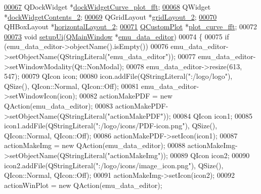 \begin{DoxyCode}
\hypertarget{a00138_source_l00067}{}\hyperlink{a00079_a7474d72172d9e269e8f3cb22bbe2fc86}{00067}     QDockWidget *\hyperlink{a00079_a7474d72172d9e269e8f3cb22bbe2fc86}{dockWidgetCurve\_plot\_fft};
\hypertarget{a00138_source_l00068}{}\hyperlink{a00079_ae304b249d83cb3152fbbf7a7d7e0e29b}{00068}     QWidget *\hyperlink{a00079_ae304b249d83cb3152fbbf7a7d7e0e29b}{dockWidgetContents\_2};
\hypertarget{a00138_source_l00069}{}\hyperlink{a00079_ab6610272c6c39cba66cab113d98dcdcd}{00069}     QGridLayout *\hyperlink{a00079_ab6610272c6c39cba66cab113d98dcdcd}{gridLayout\_2};
\hypertarget{a00138_source_l00070}{}\hyperlink{a00079_aaee23fa38e3335cc652ebd35fcdbafc8}{00070}     QHBoxLayout *\hyperlink{a00079_aaee23fa38e3335cc652ebd35fcdbafc8}{horizontalLayout\_2};
\hypertarget{a00138_source_l00071}{}\hyperlink{a00079_a2bdf46ca3b702151408e6f6bd96b3228}{00071}     \hyperlink{a00030_d8/d00/a00186}{QCustomPlot} *\hyperlink{a00079_a2bdf46ca3b702151408e6f6bd96b3228}{plot\_curve\_fft};
00072 
\hypertarget{a00138_source_l00073}{}\hyperlink{a00079_a33af8ac054888d9cc0833b699028b690}{00073}     \textcolor{keywordtype}{void} \hyperlink{a00079_a33af8ac054888d9cc0833b699028b690}{setupUi}(\hyperlink{a00058}{QMainWindow} *\hyperlink{a00008}{emu\_data\_editor})
00074     \{
00075         \textcolor{keywordflow}{if} (emu\_data\_editor->objectName().isEmpty())
00076             emu\_data\_editor->setObjectName(QStringLiteral(\textcolor{stringliteral}{"emu\_data\_editor"}));
00077         emu\_data\_editor->setWindowModality(Qt::NonModal);
00078         emu\_data\_editor->resize(613, 547);
00079         QIcon icon;
00080         icon.addFile(QStringLiteral(\textcolor{stringliteral}{":/logo/logo"}), QSize(), QIcon::Normal, QIcon::Off);
00081         emu\_data\_editor->setWindowIcon(icon);
00082         actionMakePDF = \textcolor{keyword}{new} QAction(emu\_data\_editor);
00083         actionMakePDF->setObjectName(QStringLiteral(\textcolor{stringliteral}{"actionMakePDF"}));
00084         QIcon icon1;
00085         icon1.addFile(QStringLiteral(\textcolor{stringliteral}{":/logo/icons/PDF-icon.png"}), QSize(), QIcon::Normal, QIcon::Off);
00086         actionMakePDF->setIcon(icon1);
00087         actionMakeImg = \textcolor{keyword}{new} QAction(emu\_data\_editor);
00088         actionMakeImg->setObjectName(QStringLiteral(\textcolor{stringliteral}{"actionMakeImg"}));
00089         QIcon icon2;
00090         icon2.addFile(QStringLiteral(\textcolor{stringliteral}{":/logo/icons/image\_icon.png"}), QSize(), QIcon::Normal, QIcon::Off);
00091         actionMakeImg->setIcon(icon2);
00092         actionWinPlot = \textcolor{keyword}{new} QAction(emu\_data\_editor);

\end{DoxyCode}
